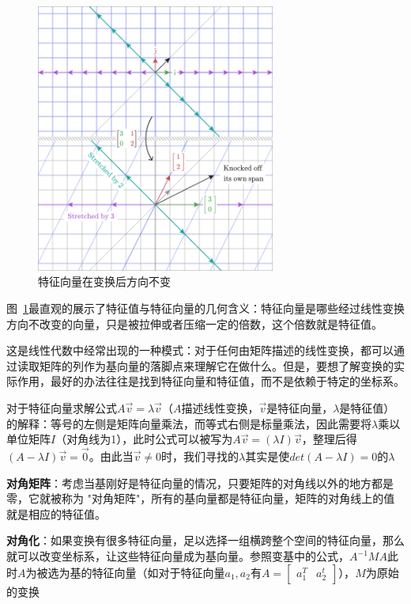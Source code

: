 \documentclass[UTF8]{ctexart}
\newcommand{\mat}[1]{\begin{bmatrix} #1 \end{bmatrix}}
\begin{document}
\begin{figure}[hb]
    \centering
    \includegraphics[width=0.7\textwidth]{./figs/eigenvec_remain_stay.png}
    \caption{特征向量在变换后方向不变}
    \label{fig:eigenvec_remain_stay}
\end{figure}

图~\ref{fig:eigenvec_remain_stay}最直观的展示了特征值与特征向量的几何含义：特征向量是哪些经过线性变换方向不改变的向量，只是被拉伸或者压缩一定的倍数，这个倍数就是特征值。

这是线性代数中经常出现的一种模式：对于任何由矩阵描述的线性变换，都可以通过读取矩阵的列作为基向量的落脚点来理解它在做什么。但是，要想了解变换的实际作用，最好的办法往往是找到特征向量和特征值，而不是依赖于特定的坐标系。

对于特征向量求解公式$A\vec{v}=\lambda\vec{v}$（$A$描述线性变换，$\vec{v}$是特征向量，$\lambda$是特征值）的解释：等号的左侧是矩阵向量乘法，而等式右侧是标量乘法，因此需要将$\lambda$乘以单位矩阵$I$（对角线为1），此时公式可以被写为$A\vec{v}=(\lambda I)\vec{v}$，整理后得$(A-\lambda I)\vec{v} = \vec{0}$。由此当$\vec{v} \neq 0$时，我们寻找的$\lambda$其实是使$det(A-\lambda I) = 0$的$\lambda$

\textbf{对角矩阵}：考虑当基刚好是特征向量的情况，只要矩阵的对角线以外的地方都是零，它就被称为 "对角矩阵"，所有的基向量都是特征向量，矩阵的对角线上的值就是相应的特征值。

\textbf{对角化}：如果变换有很多特征向量，足以选择一组横跨整个空间的特征向量，那么就可以改变坐标系，让这些特征向量成为基向量。参照变基中的公式，$A^{-1}MA$此时$A$为被选为基的特征向量（如对于特征向量$a_1,a_2$有$A=\mat{a_1^T&a_2^t}$），$M$为原始的变换
\end{document}

